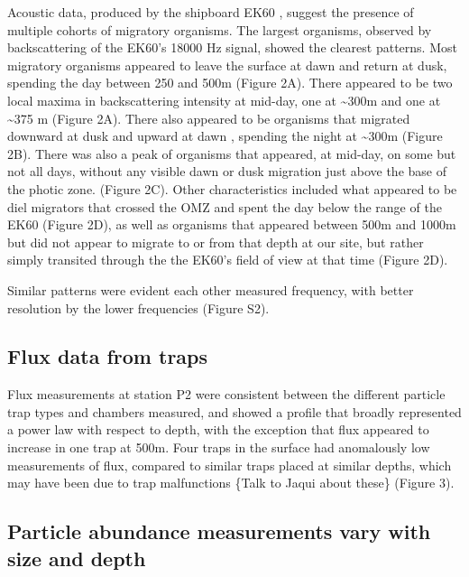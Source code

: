 \documentclass[]{article}
\begin{document}
Acoustic data, produced by the shipboard EK60 , suggest the presence of
multiple cohorts of migratory organisms. The largest organisms, observed
by backscattering of the EK60's 18000 Hz signal, showed the clearest
patterns. Most migratory organisms appeared to leave the surface at dawn
and return at dusk, spending the day between 250 and 500m (Figure 2A).
There appeared to be two local maxima in backscattering intensity at
mid-day, one at \textasciitilde{}300m and one at \textasciitilde{}375 m
(Figure 2A). There also appeared to be organisms that migrated downward
at dusk and upward at dawn , spending the night at \textasciitilde{}300m
(Figure 2B). There was also a peak of organisms that appeared, at
mid-day, on some but not all days, without any visible dawn or dusk
migration just above the base of the photic zone. (Figure 2C). Other
characteristics included what appeared to be diel migrators that crossed
the OMZ and spent the day below the range of the EK60 (Figure 2D), as
well as organisms that appeared between 500m and 1000m but did not
appear to migrate to or from that depth at our site, but rather simply
transited through the the EK60's field of view at that time (Figure 2D).

Similar patterns were evident each other measured frequency, with better
resolution by the lower frequencies (Figure S2).

\hypertarget{flux-data-from-traps}{%
\subsection{Flux data from traps}\label{flux-data-from-traps}}

Flux measurements at station P2 were consistent between the different
particle trap types and chambers measured, and showed a profile that
broadly represented a power law with respect to depth, with the
exception that flux appeared to increase in one trap at 500m. Four traps
in the surface had anomalously low measurements of flux, compared to
similar traps placed at similar depths, which may have been due to trap
malfunctions \{Talk to Jaqui about these\} (Figure 3).

\hypertarget{particle-abundance-measurements-vary-with-size-and-depth}{%
\subsection{Particle abundance measurements vary with size and
depth}\label{particle-abundance-measurements-vary-with-size-and-depth}}
\end{document}

